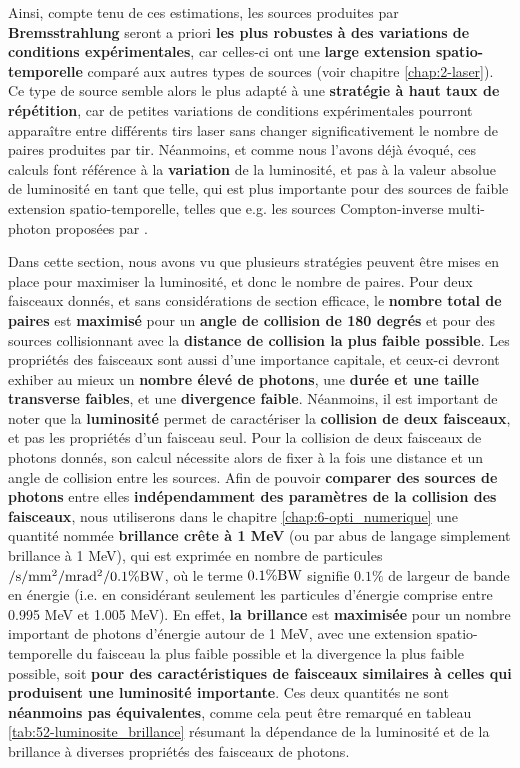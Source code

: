 \begin{refsection}
Ainsi, compte tenu de ces estimations, les sources produites par \textbf{Bremsstrahlung} seront a priori \textbf{les plus robustes à des variations de conditions expérimentales}, car celles-ci ont une \textbf{large extension spatio-temporelle} comparé aux autres types de sources (voir chapitre \ref{chap:2-laser}). Ce type de source semble alors le plus adapté à une \textbf{stratégie à haut taux de répétition}, car de petites variations de conditions expérimentales pourront apparaître entre différents tirs laser sans changer significativement le nombre de paires produites par tir. Néanmoins, et comme nous l'avons déjà évoqué, ces calculs font référence à la \textbf{variation} de la luminosité, et pas à la valeur absolue de luminosité en tant que telle, qui est plus importante pour des sources de faible extension spatio-temporelle, telles que e.g. les sources Compton-inverse multi-photon proposées par \cite{wang_2020}.

Dans cette section, nous avons vu que plusieurs stratégies peuvent être mises en place pour maximiser la luminosité, et donc le nombre de paires. Pour deux faisceaux donnés, et sans considérations de section efficace, le \textbf{nombre total de paires} est \textbf{maximisé} pour un \textbf{angle de collision de 180 degrés} et pour des sources collisionnant avec la \textbf{distance de collision la plus faible possible}. Les propriétés des faisceaux sont aussi d'une importance capitale, et ceux-ci devront exhiber au mieux un \textbf{nombre élevé de photons}, une \textbf{durée et une taille transverse faibles}, et une \textbf{divergence faible}.
Néanmoins, il est important de noter que la \textbf{luminosité} permet de caractériser la \textbf{collision de deux faisceaux}, et pas les propriétés d'un faisceau seul. Pour la collision de deux faisceaux de photons donnés, son calcul nécessite alors de fixer à la fois une distance et un angle de collision entre les sources.
Afin de pouvoir \textbf{comparer des sources de photons} entre elles \textbf{indépendamment des paramètres de la collision des faisceaux}, nous utiliserons dans le chapitre \ref{chap:6-opti_numerique} une quantité nommée \textbf{brillance crête à 1 MeV} (ou par abus de langage simplement brillance à 1 MeV), qui est exprimée en nombre de particules $\rm/s/mm^2/mrad^2/0.1\%BW$, où le terme $0.1\% \rm BW$ signifie $0.1  \%$ de largeur de bande en énergie (i.e. en considérant seulement les particules d'énergie comprise entre 0.995 MeV et 1.005 MeV). En effet, \textbf{la brillance} est \textbf{maximisée} pour un nombre important de photons d'énergie autour de 1 MeV, avec une extension spatio-temporelle du faisceau la plus faible possible et la divergence la plus faible possible, soit \textbf{pour des caractéristiques de faisceaux similaires à celles qui produisent une luminosité importante}. Ces deux quantités ne sont \textbf{néanmoins pas équivalentes}, comme cela peut être remarqué en tableau \ref{tab:52-luminosite_brillance} résumant la dépendance de la luminosité et de la brillance à diverses propriétés des faisceaux de photons.


\end{refsection}
